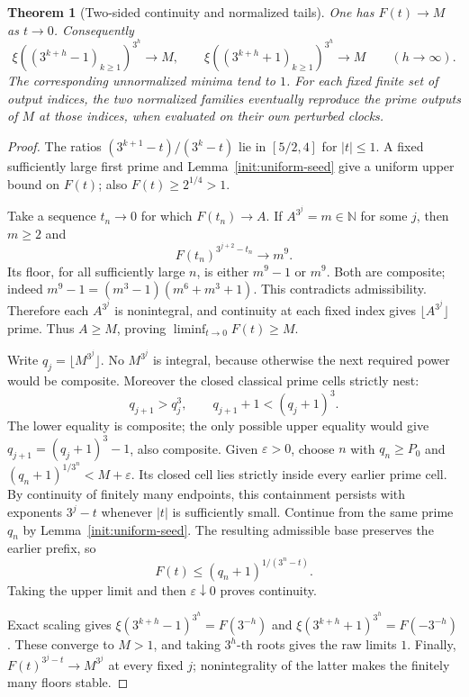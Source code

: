 \documentclass[11pt,a4paper]{article}
\newtheorem{theorem}{Theorem}[section]
\theoremstyle{definition}\newtheorem{definition}[theorem]{Definition}
\theoremstyle{remark}\newtheorem{remark}[theorem]{Remark}
\begin{document}
\begin{theorem}[Two-sided continuity and normalized tails]
\label{init:continuity}
One has $F(t)\to M$ as $t\to0$. Consequently
\[
 \xi((3^{k+h}-1)_{k\ge1})^{3^h}\longrightarrow M,
 \qquad
 \xi((3^{k+h}+1)_{k\ge1})^{3^h}\longrightarrow M
 \qquad(h\to\infty).
\]
The corresponding unnormalized minima tend to $1$.
For each fixed finite set of output indices, the two normalized
families eventually reproduce the prime outputs of $M$ at those indices,
when evaluated on their own perturbed clocks.
\end{theorem}
\begin{proof}
The ratios $(3^{k+1}-t)/(3^k-t)$ lie in $[5/2,4]$ for $|t|\le1$.
A fixed sufficiently large first prime and
Lemma~\ref{init:uniform-seed} give a uniform upper bound on $F(t)$;
also $F(t)\ge2^{1/4}>1$.

Take a sequence $t_n\to0$ for which $F(t_n)\to A$.
If $A^{3^j}=m\in\mathbb N$ for some $j$, then $m\ge2$ and
\[
 F(t_n)^{3^{j+2}-t_n}\longrightarrow m^9.
\]
Its floor, for all sufficiently large $n$, is either $m^9-1$ or $m^9$.
Both are composite; indeed
$m^9-1=(m^3-1)(m^6+m^3+1)$.
This contradicts admissibility. Therefore each $A^{3^j}$ is
nonintegral, and continuity at each fixed index gives
$\lfloor A^{3^j}\rfloor$ prime. Thus $A\ge M$, proving
$\liminf_{t\to0}F(t)\ge M$.

Write $q_j=\lfloor M^{3^j}\rfloor$. No $M^{3^j}$ is integral,
because otherwise the next required power would be composite.
Moreover the closed classical prime cells strictly nest:
\[
 q_{j+1}>q_j^3,\qquad q_{j+1}+1<(q_j+1)^3.
\]
The lower equality is composite; the only possible upper equality
would give $q_{j+1}=(q_j+1)^3-1$, also composite.
Given $\varepsilon>0$, choose $n$ with $q_n\ge P_0$ and
$(q_n+1)^{1/3^n}<M+\varepsilon$.
Its closed cell lies strictly inside every earlier prime cell.
By continuity of finitely many endpoints, this containment persists
with exponents $3^j-t$ whenever $|t|$ is sufficiently small.
Continue from the same prime $q_n$ by
Lemma~\ref{init:uniform-seed}. The resulting admissible base
preserves the earlier prefix, so
\[
 F(t)\le(q_n+1)^{1/(3^n-t)}.
\]
Taking the upper limit and then $\varepsilon\downarrow0$ proves
continuity.

Exact scaling gives
$\xi(3^{k+h}-1)^{3^h}=F(3^{-h})$ and
$\xi(3^{k+h}+1)^{3^h}=F(-3^{-h})$.
These converge to $M>1$, and taking $3^h$-th roots gives the raw
limits $1$. Finally, $F(t)^{3^j-t}\to M^{3^j}$ at every fixed $j$;
nonintegrality of the latter makes the finitely many floors stable.
\end{proof}
\end{document}
